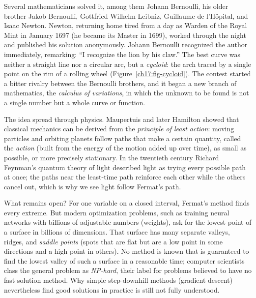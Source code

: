 \begin{historybox}
Several mathematicians solved it, among them Johann Bernoulli, his older brother Jakob Bernoulli,
Gottfried Wilhelm Leibniz, Guillaume de l'H\^opital, and Isaac Newton. Newton,
returning home tired from a day as Warden of the Royal Mint in January 1697
(he became its Master in 1699),
worked through the night and published his solution anonymously. Johann
Bernoulli recognized the author immediately, remarking: ``I recognize the lion by his
claw.'' The best curve was neither a straight line nor a circular arc, but a
\emph{cycloid}: the arch traced by a single point on the rim of a rolling
wheel (Figure~\ref{ch17:fig-cycloid}). The contest started a bitter rivalry between the Bernoulli brothers, and it
began a new branch of mathematics, the \emph{calculus of variations}, in which the
unknown to be found is not a single number but a whole curve or function.

The idea spread through physics. Maupertuis and later Hamilton showed that classical
mechanics can be derived from the \emph{principle of least action}: moving particles
and orbiting planets follow paths that make a certain quantity, called the
\emph{action} (built from the energy of the motion added up over time), as small as
possible, or more precisely stationary. In the twentieth century Richard Feynman's
quantum theory of light described light as trying every possible path at once; the
paths near the least-time path reinforce each other while the others cancel out,
which is why we see light follow Fermat's path.

What remains open? For one variable on a closed interval, Fermat's method
finds every extreme. But modern optimization problems, such as training neural
networks with billions of adjustable numbers (weights), ask for the lowest point of a
surface in billions of dimensions. That surface has many separate valleys, ridges,
and \emph{saddle points} (spots that are flat but are a low point in some directions
and a high point in others). No method is known that is guaranteed to find the lowest
valley of such a surface in a reasonable time; computer scientists class the general
problem as \emph{NP-hard}, their label for problems believed to have no fast
solution method. Why simple step-downhill methods (gradient descent) nevertheless
find good solutions in practice is still not fully understood.
\end{historybox}


